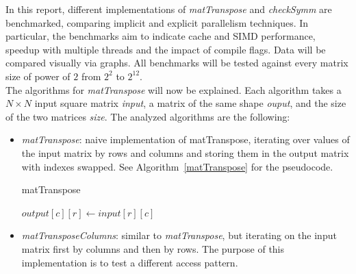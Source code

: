 \documentclass[conference]{IEEEtran}
\begin{document}
In this report, different implementations of \textit{matTranspose}
and \textit{checkSymm} are benchmarked, comparing implicit and explicit parallelism
techniques. In particular, the benchmarks aim to indicate cache and SIMD performance,
speedup with multiple threads and the impact of compile flags. Data will be compared visually via graphs. All benchmarks
will be tested against every matrix size of power of $2$ from $2^2$ to $2^{12}$.  \\
The algorithms for \textit{matTranspose} will now be explained.
Each algorithm takes a $N \times N$ input square matrix \textit{input}, a matrix of the same shape \textit{ouput}, and the size of the two matrices \textit{size}.
The analyzed algorithms are the following:
\begin{itemize}
\item \textit{matTranspose}: naive implementation of matTranspose, iterating over values of the input matrix by rows and columns and storing them in the output matrix with indexes swapped. See Algorithm~\ref{matTranspose} for the pseudocode.

\begin{algorithm}
	\caption{matTranspose}\label{matTranspose}
	\begin{algorithmic}[1]
		\State $output[c][r] \gets input[r][c]$
		\EndFor
		\EndFor
	\end{algorithmic}
\end{algorithm}

    \item \textit{matTransposeColumns}: similar to \textit{matTranspose}, but iterating on the input matrix first by columns and then by rows.
  The purpose of this implementation is to test a different access pattern.

\end{itemize}
\end{document}
